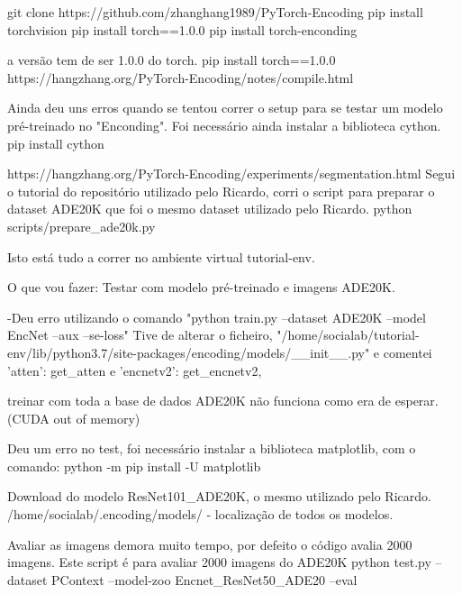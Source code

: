     git clone https://github.com/zhanghang1989/PyTorch-Encoding
    pip install torchvision
    pip install torch==1.0.0
    pip install torch-enconding
    
    a versão tem de ser 1.0.0 do torch. pip install torch==1.0.0
    https://hangzhang.org/PyTorch-Encoding/notes/compile.html

    Ainda deu uns erros quando se tentou correr o setup para se testar um modelo pré-treinado no "Enconding".
    Foi necessário ainda instalar a biblioteca cython.
    pip install cython
    
    https://hangzhang.org/PyTorch-Encoding/experiments/segmentation.html
    Segui o tutorial do repositório utilizado pelo Ricardo, corri o script para preparar o dataset ADE20K que foi o mesmo dataset utilizado pelo Ricardo.
    python scripts/prepare\_ade20k.py
    
    Isto está tudo a correr no ambiente virtual tutorial-env.
    
    
    O que vou fazer:
        Testar com modelo pré-treinado e imagens ADE20K.
    
            -Deu erro utilizando o comando "python train.py --dataset ADE20K --model EncNet --aux --se-loss" Tive de alterar o ficheiro,
            "/home/socialab/tutorial-env/lib/python3.7/site-packages/encoding/models/\_\_init\_\_.py" e comentei 'atten': get\_atten e  'encnetv2': get\_encnetv2,
            
            treinar com toda a base de dados ADE20K não funciona como era de esperar. (CUDA out of memory)
    
            Deu um erro no test, foi necessário instalar a biblioteca matplotlib, com o comando:
                python -m pip install -U matplotlib
            
            Download do modelo ResNet101\_ADE20K, o mesmo utilizado pelo Ricardo.
            /home/socialab/.encoding/models/ - localização de todos os modelos.
            
            Avaliar as imagens demora muito tempo, por defeito o código avalia 2000 imagens.
            Este script é para avaliar 2000 imagens do ADE20K
            python test.py --dataset PContext --model-zoo Encnet\_ResNet50\_ADE20 --eval
            
            
        
        
